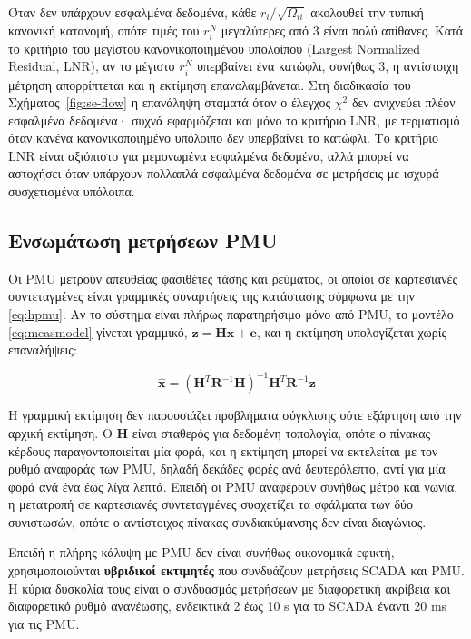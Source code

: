 Όταν δεν υπάρχουν εσφαλμένα δεδομένα, κάθε $r_i/\sqrt{\Omega_{ii}}$ ακολουθεί την τυπική
κανονική κατανομή, οπότε τιμές του $r_i^{N}$ μεγαλύτερες από 3 είναι πολύ απίθανες. Κατά το
κριτήριο του
μεγίστου κανονικοποιημένου υπολοίπου (Largest Normalized Residual, LNR), αν το μέγιστο
$r_i^{N}$ υπερβαίνει ένα κατώφλι, συνήθως 3, η αντίστοιχη μέτρηση απορρίπτεται και η
εκτίμηση επαναλαμβάνεται. Στη διαδικασία του Σχήματος~\ref{fig:se-flow}
η επανάληψη σταματά όταν ο έλεγχος $\chi^2$ δεν ανιχνεύει πλέον εσφαλμένα δεδομένα· συχνά
εφαρμόζεται και μόνο το κριτήριο LNR, με τερματισμό όταν κανένα κανονικοποιημένο υπόλοιπο δεν
υπερβαίνει το κατώφλι. Το κριτήριο LNR είναι αξιόπιστο για μεμονωμένα
εσφαλμένα δεδομένα, αλλά μπορεί να αστοχήσει όταν υπάρχουν πολλαπλά εσφαλμένα δεδομένα σε
μετρήσεις με ισχυρά συσχετισμένα υπόλοιπα.


\subsection{Ενσωμάτωση μετρήσεων PMU}

Οι PMU μετρούν απευθείας φασιθέτες τάσης και ρεύματος, οι οποίοι σε καρτεσιανές συντεταγμένες
είναι γραμμικές συναρτήσεις της κατάστασης σύμφωνα με την \eqref{eq:hpmu}. Αν το σύστημα είναι
πλήρως παρατηρήσιμο μόνο από PMU, το μοντέλο \eqref{eq:measmodel} γίνεται γραμμικό,
$\mathbf{z} = \mathbf{H}\mathbf{x} + \mathbf{e}$, και η εκτίμηση υπολογίζεται χωρίς
επαναλήψεις:

\begin{equation}
\hat{\mathbf{x}} = \left(\mathbf{H}^{T}\mathbf{R}^{-1}\mathbf{H}\right)^{-1}
                    \mathbf{H}^{T}\mathbf{R}^{-1}\mathbf{z}
\label{eq:linse}
\end{equation}

Η γραμμική εκτίμηση δεν παρουσιάζει προβλήματα σύγκλισης ούτε εξάρτηση από την αρχική
εκτίμηση. Ο $\mathbf{H}$ είναι σταθερός για δεδομένη τοπολογία, οπότε ο πίνακας κέρδους
παραγοντοποιείται μία φορά, και η εκτίμηση μπορεί να εκτελείται με τον ρυθμό αναφοράς των
PMU, δηλαδή δεκάδες φορές ανά δευτερόλεπτο, αντί για μία φορά ανά ένα έως λίγα λεπτά. Επειδή
οι PMU αναφέρουν συνήθως μέτρο και γωνία, η μετατροπή σε καρτεσιανές συντεταγμένες συσχετίζει
τα σφάλματα των δύο συνιστωσών, οπότε ο αντίστοιχος πίνακας συνδιακύμανσης δεν είναι
διαγώνιος.

Επειδή η πλήρης κάλυψη με PMU δεν είναι συνήθως οικονομικά εφικτή, χρησιμοποιούνται
\textbf{υβριδικοί εκτιμητές} που συνδυάζουν μετρήσεις SCADA και PMU. Η κύρια δυσκολία τους
είναι ο συνδυασμός μετρήσεων με διαφορετική ακρίβεια και διαφορετικό ρυθμό ανανέωσης,
ενδεικτικά 2 έως 10 s για το SCADA έναντι 20 ms για τις PMU.
